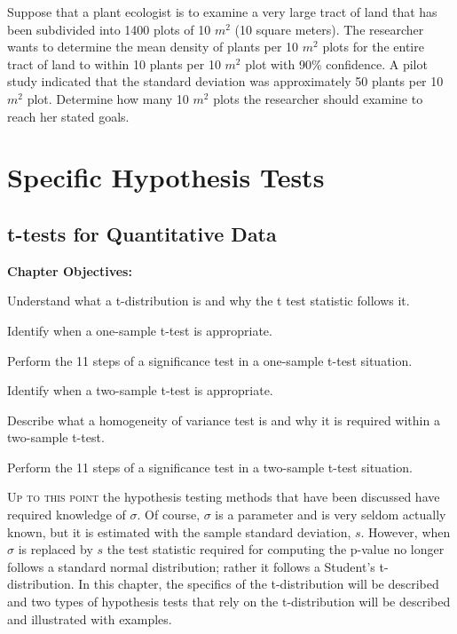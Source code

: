 \documentclass[10pt,openany]{book}\usepackage[]{graphicx}\usepackage[]{color}
\begin{document}
\begin{hwsection}
  \item \label{hwprob:CInPlants} Suppose that a plant ecologist is to examine a very large tract of land that has been subdivided into 1400 plots of 10 $m^{2}$ (10 square meters).  The researcher wants to determine the mean density of plants per 10 $m^{2}$ plots for the entire tract of land to within 10 plants per 10 $m^{2}$ plot with 90\% confidence.  A pilot study indicated that the standard deviation was approximately 50 plants per 10 $m^{2}$ plot.  Determine how many 10 $m^{2}$ plots the researcher should examine to reach her stated goals.

\end{hwsection}

    \part{Specific Hypothesis Tests}



\chapter{t-tests for Quantitative Data} \label{chap:tTest}
\begin{ChapObj}{\boxwidth}
  \textbf{Chapter Objectives:}
  \begin{Enumerate}
    \item Understand what a t-distribution is and why the t test statistic follows it.
    \item Identify when a one-sample t-test is appropriate.
    \item Perform the 11 steps of a significance test in a one-sample t-test situation.
    \item Identify when a two-sample t-test is appropriate.
    \item Describe what a homogeneity of variance test is and why it is required within a two-sample t-test.
    \item Perform the 11 steps of a significance test in a two-sample t-test situation.
  \end{Enumerate}
\end{ChapObj}

\minitoc
\newpage

\lettrine{U}{p to this point} the hypothesis testing methods that have been discussed have required knowledge of $\sigma$.  Of course, $\sigma$ is a parameter and is very seldom actually known, but it is estimated with the sample standard deviation, $s$.  However, when $\sigma$ is replaced by $s$ the test statistic required for computing the p-value no longer follows a standard normal distribution; rather it follows a Student's t-distribution.  In this chapter, the specifics of the t-distribution will be described and two types of hypothesis tests that rely on the t-distribution will be described and illustrated with examples.
\end{document}
